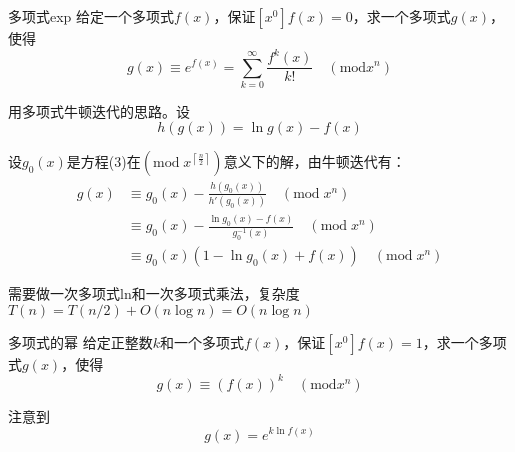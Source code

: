 \documentclass{beamer}
\begin{document}
\begin{frame}{多项式exp}
    \small
    给定一个多项式$f(x)$，保证$[x^0]f(x)=0$，求一个多项式$g(x)$，使得
    \begin{equation}
        g(x) \equiv e^{f(x)}=\sum_{k=0}^\infty \frac{f^{k}(x)}{k!} \quad (\text{mod} x^n)
    \end{equation}
    
    \vspace{1em}\pause
    用多项式牛顿迭代的思路。设
    \begin{equation*}
        h(g(x))=\ln g(x)-f(x)
    \end{equation*}

    \pause
    设$g_0(x)$是方程(3)在$(\text{mod}\;x^{\left\lceil\frac{n}{2}\right\rceil})$意义下的解，由牛顿迭代有：
    \begin{align*}
        g(x)&\equiv g_0(x) -\frac{h(g_0(x))}{h'(g_0(x))} \quad (\text{mod}\;x^n)\\
        &\equiv g_0(x) -\frac{\ln g_0(x)-f(x)}{g_0^{-1}(x)} \quad (\text{mod}\;x^n)\\
        &\equiv g_0(x) \left(1-\ln g_0(x) + f(x)\right)\quad (\text{mod}\;x^n)
    \end{align*}

    需要做一次多项式ln和一次多项式乘法，复杂度$T(n)=T(n/2)+O(n\log n)=O(n\log n)$
\end{frame}

\begin{frame}{多项式的幂}
    \small
    给定正整数$k$和一个多项式$f(x)$，保证$[x^0]f(x)=1$，求一个多项式$g(x)$，使得
    \begin{equation}
        g(x) \equiv \left(f(x)\right)^k \quad (\text{mod} x^n)
    \end{equation}
    
    \vspace{1em}\pause
    注意到
    \begin{equation*}
        g(x)=e^{k\ln f(x)}
    \end{equation*}
\end{frame}
\end{document}
